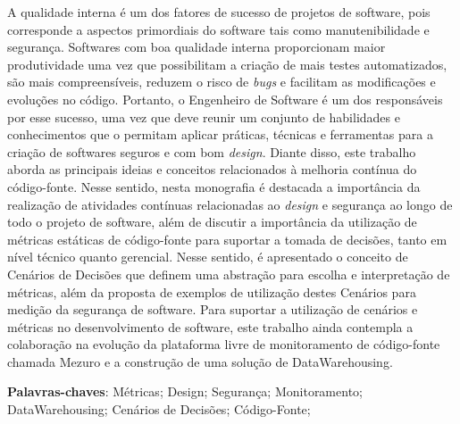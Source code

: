 \begin{resumo}

A qualidade interna é um dos fatores de sucesso de projetos de software, pois corresponde a aspectos primordiais do software tais como manutenibilidade e segurança. Softwares com boa qualidade interna proporcionam maior produtividade uma vez que possibilitam a criação de mais testes automatizados, são mais compreensíveis, reduzem o risco de \emph{bugs} e facilitam as modificações e evoluções no código. Portanto, o Engenheiro de Software é um dos responsáveis por esse sucesso, uma vez que deve reunir um conjunto de habilidades e conhecimentos que o permitam aplicar práticas, técnicas e ferramentas para a criação de softwares seguros e com bom \emph{design}. Diante disso, este trabalho aborda as principais ideias e conceitos relacionados à melhoria contínua do código-fonte. Nesse sentido, nesta monografia é destacada a importância da realização de atividades contínuas relacionadas ao \emph{design} e segurança ao longo de todo o projeto de software, além de discutir a importância da utilização de métricas estáticas de código-fonte para suportar a tomada de decisões, tanto em nível técnico quanto gerencial. Nesse sentido, é apresentado o conceito de Cenários de Decisões que definem uma abstração para escolha e interpretação de métricas, além da proposta de exemplos de utilização destes Cenários para medição da segurança de software. Para suportar a utilização de cenários e métricas no desenvolvimento de software, este trabalho ainda contempla a colaboração na evolução da plataforma livre de monitoramento de código-fonte chamada Mezuro e a construção de uma solução de DataWarehousing.

 \vspace{\onelineskip}

 \noindent
 \textbf{Palavras-chaves}: Métricas; Design; Segurança; Monitoramento; DataWarehousing; Cenários de Decisões; Código-Fonte;
\end{resumo}
